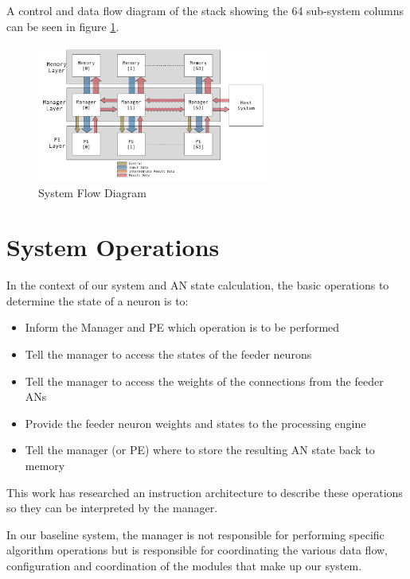 \documentclass[journal]{IEEEtran}
\begin{document}
A control and data flow diagram of the stack showing the 64 sub-system columns can be seen in figure \ref{fig:FlowDiagram}.
\begin{figure}[!t]
\centering
\captionsetup{justification=centering}
\centerline{
\mbox{\includegraphics[width=3.0in]{FlowDiagram.jpg}}
}
\center\caption{System Flow Diagram}
\label{fig:FlowDiagram}
\end{figure}


\section{System Operations}
\label{sec:System Operations}
In the context of our system and AN state calculation, the basic operations to determine the state of a neuron is to:

\begin{itemize}
    \item Inform the Manager and PE which operation is to be performed
    \item Tell the manager to access the states of the feeder neurons
    \item Tell the manager to access the weights of the connections from the feeder ANs
    \item Provide the feeder neuron weights and states to the processing engine
    \item Tell the manager (or PE) where to store the resulting AN state back to memory
\end{itemize}

This work has researched an instruction architecture to describe these operations so they can be interpreted by the manager. 

In our baseline system, the manager is not responsible for performing specific algorithm operations but is responsible for coordinating the various data flow, configuration and coordination of the modules that make up our system.
\end{document}

